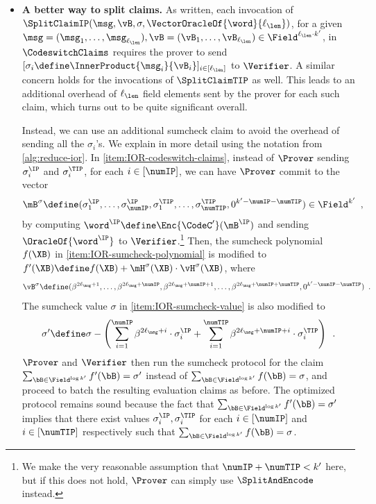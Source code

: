 \begin{itemize}
    \item \textbf{A better  way to split claims. } 
    As written, each invocation of $\SplitClaimIP(\msg, \vB, \sigma, \VectorOracleOf{\word}{\ell_{\len}})$, for a given $\msg = (\msg_1, \dotsc, \msg_{\ell_{\len}}), \vB = (\vB_1, \dotsc, \vB_{\ell_{\len}}) \in \Field^{\ell_{\len} \cdot k'}$, in $\CodeswitchClaims$ requires the prover to send $[\sigma_i \define \InnerProduct{\msg_i}{\vB_i}]_{i \in [\ell_{\len}]}$ to $\Verifier$.
    A similar concern holds for the invocations of $\SplitClaimTIP$ as well.
    This leads to an additional overhead of $\ell_{\len}$ field elements sent by the prover for each such claim, which turns out to be quite significant overall.

    Instead, we can use an additional sumcheck claim to avoid the overhead of sending all the $\sigma_i$'s.
    We explain in more detail using the notation from \cref{alg:reduce-ior}.
    In \cref{item:IOR-codeswitch-claims}, instead of $\Prover$ sending $\sigma^{\IP}_i$ and $\sigma^{\TIP}_i$, for each $i \in [\numIP]$, we can have $\Prover$ commit to the vector
    \[
        \mB^{\sigma} \define (\sigma^{\IP}_1, \dotsc, \sigma^{\IP}_{\numIP}, \sigma^{\TIP}_1, \dotsc, \sigma^{\TIP}_{\numTIP}, 0^{k' - \numIP - \numTIP}) \in \Field^{k'} \enspace,
    \]
    by computing $\word^{\IP} \define \Enc{\CodeC'}(\mB^{\IP})$ and sending $\OracleOf{\word^{\IP}}$ to $\Verifier$.\footnote{We make the very reasonable assumption that $\numIP + \numTIP < k'$ here, but if this does not hold, $\Prover$ can simply use $\SplitAndEncode$ instead.}
    Then, the sumcheck polynomial $f(\XB)$ in \cref{item:IOR-sumcheck-polynomial} is modified to $f'(\XB) \define f(\XB) + \mH^{\sigma}(\XB) \cdot \vH^{\sigma}(\XB)$, where
    \[
        \vB^{\sigma} \define (\beta^{2\ell_{\msg} + 1}, \dotsc, \beta^{2\ell_{\msg} + \numIP}, \beta^{2\ell_{\msg} + \numIP + 1}, \dotsc, \beta^{2\ell_{\msg} + \numIP + \numTIP}, 0^{k' - \numIP - \numTIP}) \enspace .
    \]
    The sumcheck value $\sigma$ in \cref{item:IOR-sumcheck-value} is also modified to 
    \[
        \sigma' \define \sigma - \left ( \sum_{i=1}^{\numIP} \beta^{2\ell_{\msg} + i} \cdot \sigma^{\IP}_i + \sum_{i=1}^{\numTIP} \beta^{2\ell_{\msg} + \numIP + i} \cdot \sigma^{\TIP}_i \right ) \enspace.
    \]
    $\Prover$ and $\Verifier$ then run the sumcheck protocol for the claim $\sum_{\bB \in \Field^{\log k'}} f'(\bB) = \sigma'$ instead of $\sum_{\bB \in \Field^{\log k'}} f(\bB) = \sigma$, and proceed to batch the resulting evaluation claims as before. 
    The optimized protocol remains sound because the fact that $\sum_{\bB \in \Field^{\log k'}} f'(\bB) = \sigma'$ implies that there exist values $\sigma^{\IP}_i, \sigma^{\TIP}_i$ for each $i \in [\numIP]$ and $i \in [\numTIP]$ respectively such that $\sum_{\bB \in \Field^{\log k'}} f(\bB) = \sigma$.


\end{itemize}
